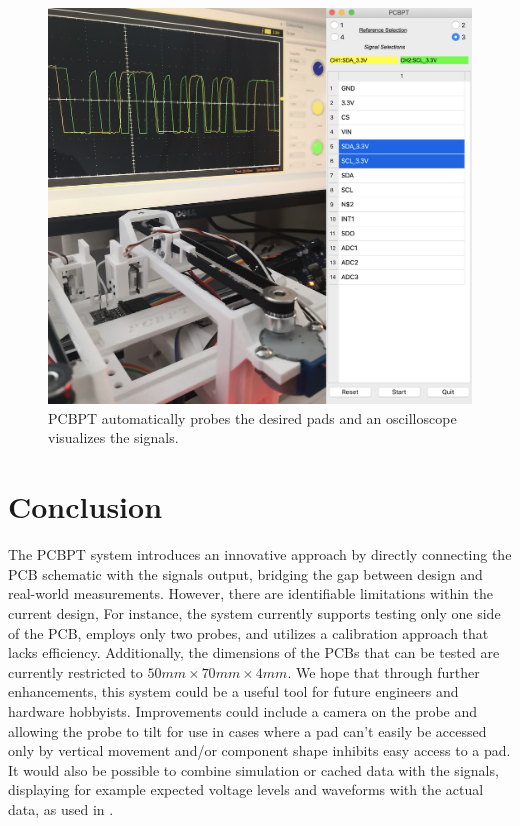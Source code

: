 \documentclass[sigconf]{acmart}
\begin{document}
\begin{figure}[h]
  \centering
  \includegraphics[width=\linewidth]{result.png}
  \caption{PCBPT automatically probes the desired pads and an oscilloscope visualizes the signals.}
  \label{result}
\end{figure}

\section{Conclusion}
The PCBPT system introduces an innovative approach by directly connecting the PCB schematic with the signals output, bridging the gap between design and real-world measurements. However, there are identifiable limitations within the current design, For instance, the system currently supports testing only one side of the PCB, employs only two probes, and utilizes a calibration approach that lacks efficiency. Additionally, the dimensions of the PCBs that can be tested are currently restricted to $50mm \times 70mm \times 4mm$. We hope that through further enhancements, this system could be a useful tool for future engineers and hardware hobbyists.  Improvements could include a camera on the probe and allowing the probe to tilt for use in cases where a pad can’t easily be accessed only by vertical movement and/or component shape inhibits easy access to a pad.  It would also be possible to combine simulation or cached data with the signals, displaying for example expected voltage levels and waveforms with the actual data, as used in \cite{boardlab}.






\appendix
\end{document}

